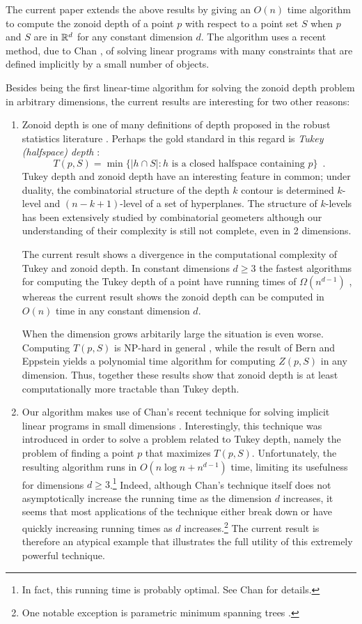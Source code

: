 \documentclass[lotsofwhite]{patmorin}
\begin{document}
The current paper extends the above results by giving an $O(n)$ time
algorithm to compute the zonoid depth of a point $p$ with respect to a
point set $S$ when $p$ and $S$ are in $\mathbb{R}^d$ for any constant
dimension $d$.  The algorithm uses a recent method, due to Chan
\cite{X}, of solving linear programs with many constraints that are
defined implicitly by a small number of objects.

Besides being the first linear-time algorithm for solving the zonoid
depth problem in arbitrary dimensions, the current results are
interesting for two other reasons:

\begin{enumerate}
\item Zonoid depth is one of many definitions of depth proposed in the
robust statistics literature \cite{X,X,X,X}.  Perhaps the gold
standard in this regard is \emph{Tukey (halfspace) depth} \cite{t75}:
\[
      T(p,S) = \min\{ |h\cap S| : \mbox{$h$ is a closed halfspace
containing $p$} \} \enspace .
\]
Tukey depth and zonoid depth have an interesting feature in common; under
duality, the combinatorial structure of the depth $k$ contour is
determined $k$-level and $(n-k+1)$-level of a set of hyperplanes. The
structure of $k$-levels has been extensively studied by combinatorial
geometers \cite{X,X,X} although our
understanding of their complexity is still not complete, even in 2
dimensions.

The current result shows a divergence in the computational complexity
of Tukey and zonoid depth.  In constant dimensions $d\ge 3$ the
fastest algorithms for computing the Tukey depth of a point have
running times of $\Omega(n^{d-1})$ \cite{cXX}, whereas the
current result shows the zonoid depth can be computed in $O(n)$ time
in any constant dimension $d$.  

When the dimension grows arbitarily large the situation is even worse.
Computing $T(p,S)$ is NP-hard in general \cite{mfsXX}, while the
result of Bern and Eppstein \cite{beXX} yields a polynomial time
algorithm for computing $Z(p,S)$ in any dimension.  Thus, together
these results show that zonoid depth is at least computationally more
tractable than Tukey depth.

\item Our algorithm makes use of Chan's recent technique for solving
implicit linear programs in small dimensions \cite{X}.  Interestingly,
this technique was introduced in order to solve a problem related to
Tukey depth, namely the problem of finding a point $p$ that maximizes
$T(p,S)$.  Unfortunately, the resulting algorithm runs in $O(n\log n +
n^{d-1})$ time, limiting its usefulness for dimensions $d\ge
3$.\footnote{In fact, this running time is probably optimal. See Chan
\cite[Section 1.4]{c04} for details.}  Indeed, although Chan's
technique itself does not asymptotically increase the running time as
the dimension $d$ increases, it seems that most applications of the
technique either break down or have quickly increasing running times
as $d$ increases.\footnote{One notable exception is parametric minimum
spanning trees \cite{eXX}.}  The current result is therefore an
atypical example that illustrates the full utility of this extremely
powerful technique.
\end{enumerate}
\end{document}
